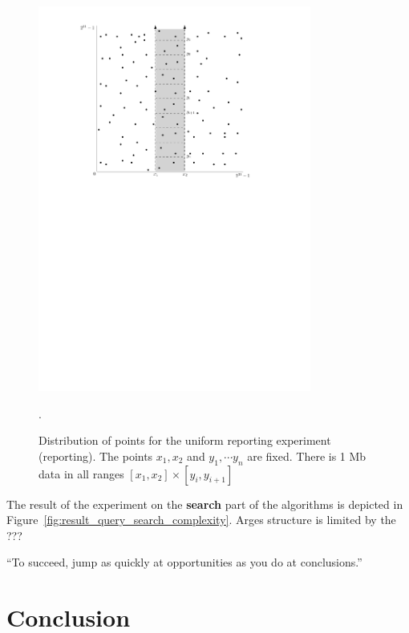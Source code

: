 \documentclass[twoside,11pt,openright]{report}
\begin{document}
\begin{figure}[h]
	\centering
	\includegraphics[width=0.8\textwidth]{../figures/query_uniform_fix_x}
	\caption{Distribution of points for the uniform reporting experiment (reporting). The points $x_1, x_2$ and $y_1, \cdots y_n$ are fixed. There is 1 Mb data in all ranges $[x_1, x_2] \times [y_i, y_{i+1}]$}.
	\label{fig:experiment_query_uniform_fix_x}
\end{figure}


The result of the experiment on the \textbf{search} part of the algorithms is depicted in Figure~\ref{fig:result_query_search_complexity}. Arges structure is limited by the ???

\begin{savequote}[0.4\textwidth]
``To succeed, jump as quickly at opportunities as you do at conclusions.''
\end{savequote}
\chapter{Conclusion}
\label{chp:conclusion}
\end{document}
